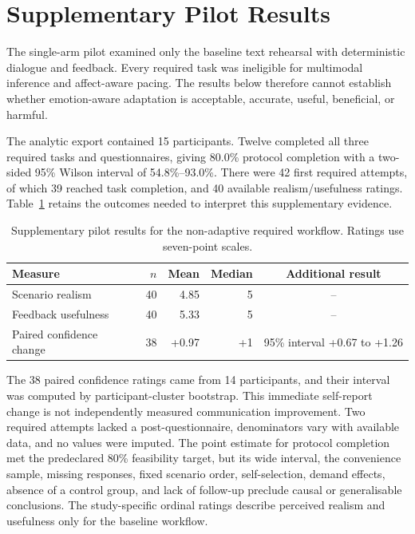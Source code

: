 \section{Supplementary Pilot Results}
\label{subsec:participant-results}

The single-arm pilot examined only the baseline text rehearsal with deterministic dialogue and feedback. Every required task was ineligible for multimodal inference and affect-aware pacing. The results below therefore cannot establish whether emotion-aware adaptation is acceptable, accurate, useful, beneficial, or harmful.

The analytic export contained 15 participants. Twelve completed all three required tasks and questionnaires, giving 80.0\% protocol completion with a two-sided 95\% Wilson interval of 54.8\%--93.0\%. There were 42 first required attempts, of which 39 reached task completion, and 40 available realism/usefulness ratings. Table~\ref{tab:pilot-questionnaire-results} retains the outcomes needed to interpret this supplementary evidence.

\begin{table}[htbp]
\centering
\caption{Supplementary pilot results for the non-adaptive required workflow. Ratings use seven-point scales.}
\label{tab:pilot-questionnaire-results}
\footnotesize
\begin{tabular}{|l|r|r|r|c|}
\hline
\textbf{Measure} & \textbf{$n$} & \textbf{Mean} & \textbf{Median} & \textbf{Additional result} \\ \hline
Scenario realism & 40 & 4.85 & 5 & -- \\ \hline
Feedback usefulness & 40 & 5.33 & 5 & -- \\ \hline
Paired confidence change & 38 & +0.97 & +1 & 95\% interval +0.67 to +1.26 \\ \hline
\end{tabular}
\end{table}

The 38 paired confidence ratings came from 14 participants, and their interval was computed by participant-cluster bootstrap. This immediate self-report change is not independently measured communication improvement. Two required attempts lacked a post-questionnaire, denominators vary with available data, and no values were imputed. The point estimate for protocol completion met the predeclared 80\% feasibility target, but its wide interval, the convenience sample, missing responses, fixed scenario order, self-selection, demand effects, absence of a control group, and lack of follow-up preclude causal or generalisable conclusions. The study-specific ordinal ratings describe perceived realism and usefulness only for the baseline workflow.


